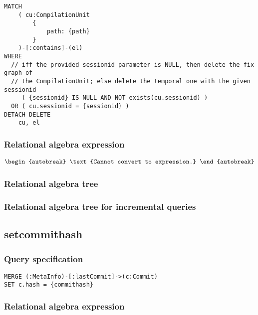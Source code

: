 \begin{lstlisting}
MATCH
	( cu:CompilationUnit
		{
			path: {path}
		}
	)-[:contains]-(el)
WHERE
  // iff the provided sessionid parameter is NULL, then delete the fix graph of
  // the CompilationUnit; else delete the temporal one with the given sessionid
     ( {sessionid} IS NULL AND NOT exists(cu.sessionid) )
  OR ( cu.sessionid = {sessionid} )
DETACH DELETE
	cu, el
\end{lstlisting}

\subsubsection*{Relational algebra expression}

\begin{align*}
\begin{autobreak}
\text{Cannot convert to expression.}
\end{autobreak}
\end{align*}

\subsubsection*{Relational algebra tree}


\subsubsection*{Relational algebra tree for incremental queries}

\subsection{setcommithash}

\subsubsection*{Query specification}

\begin{lstlisting}
MERGE (:MetaInfo)-[:lastCommit]->(c:Commit)
SET c.hash = {commithash}
\end{lstlisting}

\subsubsection*{Relational algebra expression}

